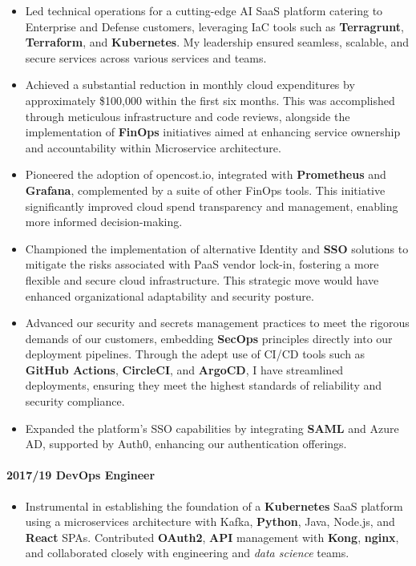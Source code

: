 \documentclass[
]{article}
\providecommand{\tightlist}{%
  \setlength{\itemsep}{0pt}\setlength{\parskip}{0pt}}
\begin{document}
\begin{itemize}
\tightlist
\item
  Led technical operations for a cutting-edge AI SaaS platform catering
  to Enterprise and Defense customers, leveraging IaC tools such as
  \textbf{Terragrunt}, \textbf{Terraform}, and \textbf{Kubernetes}. My
  leadership ensured seamless, scalable, and secure services across
  various services and teams.
\item
  Achieved a substantial reduction in monthly cloud expenditures by
  approximately \$100,000 within the first six months. This was
  accomplished through meticulous infrastructure and code reviews,
  alongside the implementation of \textbf{FinOps} initiatives aimed at
  enhancing service ownership and accountability within Microservice
  architecture.
\item
  Pioneered the adoption of opencost.io, integrated with
  \textbf{Prometheus} and \textbf{Grafana}, complemented by a suite of
  other FinOps tools. This initiative significantly improved cloud spend
  transparency and management, enabling more informed decision-making.
\item
  Championed the implementation of alternative Identity and \textbf{SSO}
  solutions to mitigate the risks associated with PaaS vendor lock-in,
  fostering a more flexible and secure cloud infrastructure. This
  strategic move would have enhanced organizational adaptability and
  security posture.
\item
  Advanced our security and secrets management practices to meet the
  rigorous demands of our customers, embedding \textbf{SecOps}
  principles directly into our deployment pipelines. Through the adept
  use of CI/CD tools such as \textbf{GitHub Actions}, \textbf{CircleCI},
  and \textbf{ArgoCD}, I have streamlined deployments, ensuring they
  meet the highest standards of reliability and security compliance.
\item
  Expanded the platform's SSO capabilities by integrating \textbf{SAML}
  and Azure AD, supported by Auth0, enhancing our authentication
  offerings.
\end{itemize}

\hypertarget{devops-engineer}{%
\paragraph{2017/19 DevOps Engineer}\label{devops-engineer}}

\begin{itemize}
\tightlist
\item
  Instrumental in establishing the foundation of a \textbf{Kubernetes}
  SaaS platform using a microservices architecture with Kafka,
  \textbf{Python}, Java, Node.js, and \textbf{React} SPAs. Contributed
  \textbf{OAuth2}, \textbf{API} management with \textbf{Kong},
  \textbf{nginx}, and collaborated closely with engineering and
  \emph{data science} teams.
\end{itemize}
\end{document}
